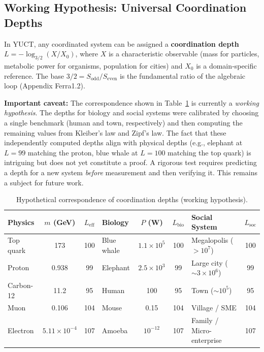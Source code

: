 \documentclass[11pt]{article}
\theoremstyle{remark}
\begin{document}
	\subsection{Working Hypothesis: Universal Coordination Depths}
	\label{sec:isomorphism}
	
	In YUCT, any coordinated system can be assigned a \textbf{coordination depth} \(L = -\log_{3/2}(X/X_0)\), where \(X\) is a characteristic observable (mass for particles, metabolic power for organisms, population for cities) and \(X_0\) is a domain‑specific reference. The base \(3/2 = S_{\mathrm{odd}}/S_{\mathrm{even}}\) is the fundamental ratio of the algebraic loop (Appendix Ferra1.2).
	
	\textbf{Important caveat:} The correspondence shown in Table~\ref{tab:universal_depths} is currently a \emph{working hypothesis}. The depths for biology and social systems were calibrated by choosing a single benchmark (human and town, respectively) and then computing the remaining values from Kleiber's law and Zipf's law. The fact that these independently computed depths align with physical depths (e.g., elephant at \(L=99\) matching the proton, blue whale at \(L=100\) matching the top quark) is intriguing but does not yet constitute a proof. A rigorous test requires predicting a depth for a new system \emph{before} measurement and then verifying it. This remains a subject for future work.
	
	\begin{table}[H]
		\centering
		\caption{Hypothetical correspondence of coordination depths (working hypothesis).}
		\label{tab:universal_depths}
		\footnotesize
		\begin{tabular}{l c c l c c l c}
			\toprule
			\textbf{Physics} & \(m\) (GeV) & \(L_{\mathrm{eff}}\) & \textbf{Biology} & \(P\) (W) & \(L_{\mathrm{bio}}\) & \textbf{Social System} & \(L_{\mathrm{soc}}\) \\
			\midrule
			Top quark & 173 & 100 & Blue whale & \(1.1\times10^5\) & 100 & Megalopolis ($>10^7$) & 100 \\
			Proton & 0.938 & 99 & Elephant & \(2.5\times10^3\) & 99 & Large city ($\sim 3\times10^6$) & 99 \\
			Carbon-12 & 11.2 & 95 & Human & 100 & 95 & Town ($\sim 10^5$) & 95 \\
			Muon & 0.106 & 104 & Mouse & 0.15 & 104 & Village / SME & 104 \\
			Electron & \(5.11\times10^{-4}\) & 107 & Amoeba & \(10^{-12}\) & 107 & Family / Micro-enterprise & 107 \\
			\bottomrule
		\end{tabular}
	\end{table}
	
\end{document}
